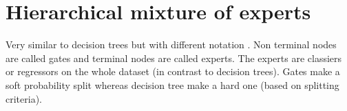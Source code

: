 \documentclass[12pt,a4paper]{article}
\begin{document}
\section{Hierarchical mixture of experts}
Very similar to decision trees but with different notation \cite{hasties}. Non terminal nodes are called gates and terminal nodes are called experts. The experts are classiers or regressors on the whole dataset (in contrast to decision trees). Gates make a soft probability split whereas decision tree make a hard one (based on splitting criteria).
\begin{comment}

\subsection{Decison Tree Algorithms}
Having all ingredients at hand we can summarize the specific decision tree algorithms. They mainly differ in the pruning strategies and the exact way to split nodes.
\begin{itemize}\itemsep0em 
	\item CART
	\item C4.5
	\item Patient rule induction method (PRIM)
	\item Multivariate adaptive regression splines (MARS)
	\item Hierarchical mixture of experts (HME)
	\item Combining neural networks and decision trees \cite{DBLP:journals/corr/abs-1711-09784}
	\item Bayesian approaches (Denison et al., 1998; Chipman et al., 1998, 2002, 2010)
\end{itemize}
Disadvantages: split only parallel to features.
\paragraph{Missing values}
Instead of the standard procedures with missing values (throwing away datapoints or fetures with missing values or imputing) decision trees offer additional possibilities:
\begin{itemize}
	\item "Missing" as a category. This is applicable to categorical predictors
	\item Surrogate variables.
	\item https://newonlinecourses.science.psu.edu/stat508/lesson/11
	\item https://people.cs.pitt.edu/~milos/courses/cs2750-Spring03/lectures/class19.pdf
	

\end{comment}
\end{document}
